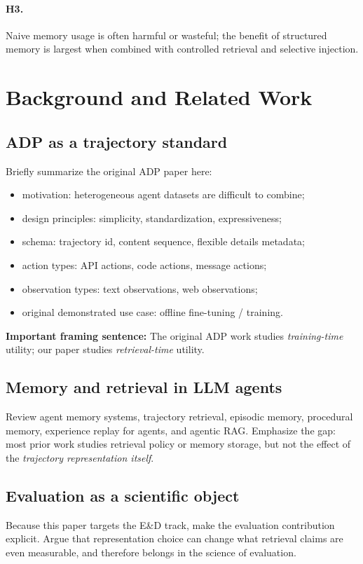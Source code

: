 \documentclass{article}
\newcommand{\ADP}{\textsc{ADP}}
\begin{document}
\paragraph{H3.}
Naive memory usage is often harmful or wasteful; the benefit of structured memory is largest when
combined with controlled retrieval and selective injection.

\section{Background and Related Work}

\subsection{\ADP{} as a trajectory standard}
Briefly summarize the original \ADP{} paper here:
\begin{itemize}[leftmargin=*,itemsep=2pt,topsep=2pt]
    \item motivation: heterogeneous agent datasets are difficult to combine;
    \item design principles: simplicity, standardization, expressiveness;
    \item schema: trajectory id, content sequence, flexible details metadata;
    \item action types: API actions, code actions, message actions;
    \item observation types: text observations, web observations;
    \item original demonstrated use case: offline fine-tuning / training.
\end{itemize}
\textbf{Important framing sentence:}
The original \ADP{} work studies \emph{training-time} utility; our paper studies \emph{retrieval-time}
utility.

\subsection{Memory and retrieval in LLM agents}
Review agent memory systems, trajectory retrieval, episodic memory, procedural memory,
experience replay for agents, and agentic RAG.
Emphasize the gap:
most prior work studies retrieval policy or memory storage, but not the effect of the
\emph{trajectory representation itself}.

\subsection{Evaluation as a scientific object}
Because this paper targets the E\&D track, make the evaluation contribution explicit.
Argue that representation choice can change what retrieval claims are even measurable,
and therefore belongs in the science of evaluation.
\end{document}
